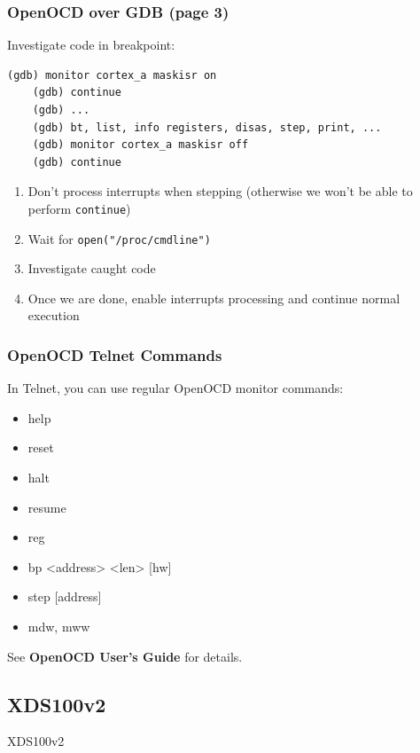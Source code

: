 \documentclass[aspectratio=169,usenames,dvipsnames]{beamer}
\newcounter{cont}
\begin{document}
\begin{frame}[containsverbatim]
  \frametitle{OpenOCD over GDB (page 3)}
  Investigate code in breakpoint:
  \begin{lstlisting}[numbers=none]
    (gdb) monitor cortex_a maskisr on
    (gdb) continue
    (gdb) ...
    (gdb) bt, list, info registers, disas, step, print, ...
    (gdb) monitor cortex_a maskisr off
    (gdb) continue
  \end{lstlisting}
  \begin{enumerate}
    \item Don't process interrupts when stepping (otherwise we won't be
          able to perform \texttt{continue})
    \item Wait for \texttt{open("/proc/cmdline")}
    \item Investigate caught code
    \item Once we are done, enable interrupts processing and continue normal
          execution
  \end{enumerate}
\end{frame}

\begin{frame}[containsverbatim]
  \frametitle{OpenOCD Telnet Commands}
  In Telnet, you can use regular OpenOCD monitor commands:
  \begin{itemize}
    \item help
    \item reset
    \item halt
    \item resume
    \item reg
    \item bp <address> <len> [hw]
    \item step [address]
    \item mdw, mww
  \end{itemize}
  See \textbf{OpenOCD User's Guide} for details.
\end{frame}

\subsection{XDS100v2}

\begin{frame}[standout]
  XDS100v2
\end{frame}
\end{document}

